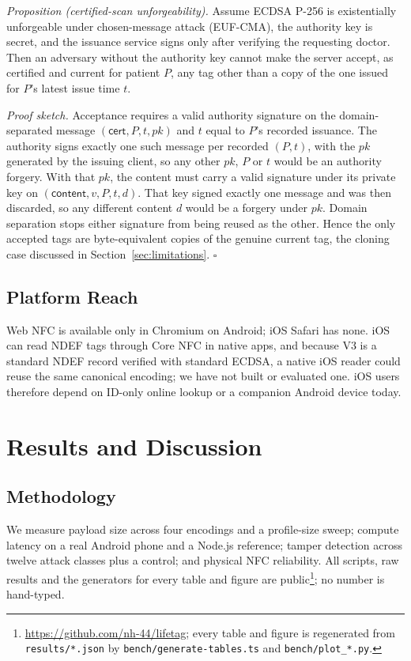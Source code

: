 \documentclass[conference]{IEEEtran}
\begin{document}
\textit{Proposition (certified-scan unforgeability).} Assume ECDSA P-256 is existentially unforgeable under chosen-message attack (EUF-CMA), the authority key is secret, and the issuance service signs only after verifying the requesting doctor. Then an adversary without the authority key cannot make the server accept, as certified and current for patient $P$, any tag other than a copy of the one issued for $P$'s latest issue time $t$.

\textit{Proof sketch.} Acceptance requires a valid authority signature on the domain-separated message $(\textsf{cert}, P, t, pk)$ and $t$ equal to $P$'s recorded issuance. The authority signs exactly one such message per recorded $(P, t)$, with the $pk$ generated by the issuing client, so any other $pk$, $P$ or $t$ would be an authority forgery. With that $pk$, the content must carry a valid signature under its private key on $(\textsf{content}, v, P, t, d)$. That key signed exactly one message and was then discarded, so any different content $d$ would be a forgery under $pk$. Domain separation stops either signature from being reused as the other. Hence the only accepted tags are byte-equivalent copies of the genuine current tag, the cloning case discussed in Section~\ref{sec:limitations}. \hfill$\square$

\subsection{Platform Reach}
\label{sec:platform}
Web NFC is available only in Chromium on Android; iOS Safari has none. iOS can read NDEF tags through Core NFC in native apps, and because V3 is a standard NDEF record verified with standard ECDSA, a native iOS reader could reuse the same canonical encoding; we have not built or evaluated one. iOS users therefore depend on ID-only online lookup or a companion Android device today.

\section{Results and Discussion}
\label{sec:results}

\subsection{Methodology}
We measure payload size across four encodings and a profile-size sweep; compute latency on a real Android phone and a Node.js reference; tamper detection across twelve attack classes plus a control; and physical NFC reliability. All scripts, raw results and the generators for every table and figure are public\footnote{\url{https://github.com/nh-44/lifetag}; every table and figure is regenerated from \texttt{results/*.json} by \texttt{bench/generate-tables.ts} and \texttt{bench/plot\_*.py}.}; no number is hand-typed.
\end{document}
